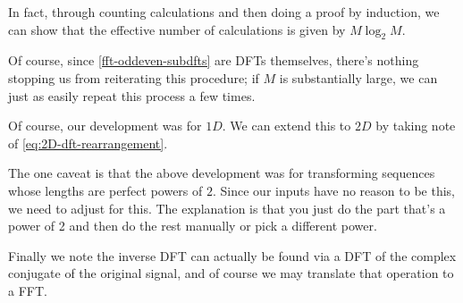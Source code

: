 In fact, through counting calculations and then doing a proof by induction, we can show that the effective number of calculations is given by $M\log_2{M}$. %

Of course, since \cref{fft-oddeven-subdfts} are DFTs themselves, there's nothing stopping us from reiterating this procedure; if $M$ is substantially large, we can just as easily repeat this process a few times.

Of course, our development was for $1D$.  We can extend this to $2D$ by taking note of \cref{eq:2D-dft-rearrangement}.

The one caveat is that the above development was for transforming sequences whose lengths are perfect powers of $2$. Since our inputs have no reason to be this, we need to adjust for this. The explanation is that you just do the part that's a power of 2 and  then do the rest manually or pick a different power.

Finally we note the inverse DFT can actually be found via a DFT of the complex conjugate of the original signal, and of course we may translate that operation to a FFT. %


